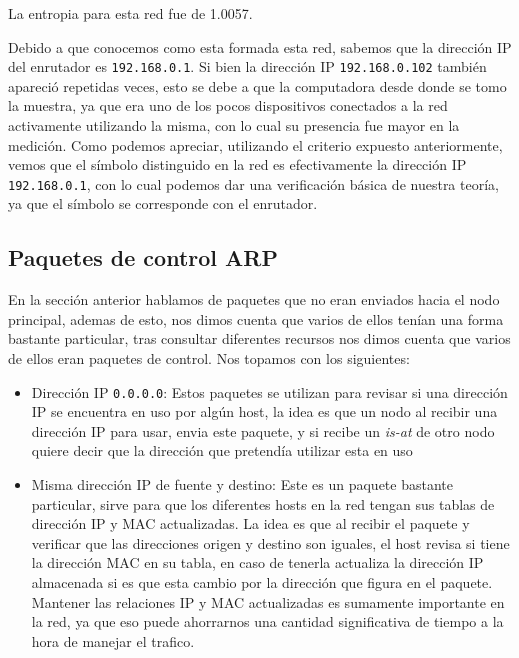 La entropia para esta red fue de 1.0057.


Debido a que conocemos como esta formada esta red, sabemos que la dirección IP del enrutador es \texttt{192.168.0.1}. Si bien la dirección IP \texttt{192.168.0.102} también apareció repetidas veces, esto se debe a que la computadora desde donde se tomo la muestra, ya que era uno de los pocos dispositivos conectados a la red activamente utilizando la misma, con lo cual su presencia fue mayor en la medición. Como podemos apreciar, utilizando el criterio expuesto anteriormente, vemos que el símbolo distinguido en la red es efectivamente la dirección IP \texttt{192.168.0.1}, con lo cual podemos dar una verificación básica de nuestra teoría, ya que el símbolo se corresponde con el enrutador.

\subsection{Paquetes de control ARP}

En la sección anterior hablamos de paquetes que no eran enviados hacia el nodo principal, ademas de esto, nos dimos cuenta que varios de ellos tenían una forma bastante particular, tras consultar diferentes recursos nos dimos cuenta que varios de ellos eran paquetes de control. Nos topamos con los siguientes:

\begin{itemize}
	\item Dirección IP \texttt{0.0.0.0}: Estos paquetes se utilizan para revisar si una dirección IP se encuentra en uso por algún host, la idea es que un nodo al recibir una dirección IP para usar, envia este paquete, y si recibe un \textit{is-at} de otro nodo quiere decir que la dirección que pretendía utilizar esta en uso
	\item Misma dirección IP de fuente y destino: Este es un paquete bastante particular, sirve para que los diferentes hosts en la red tengan sus tablas de dirección IP y MAC actualizadas. La idea es que al recibir el paquete y verificar que las direcciones origen y destino son iguales, el host revisa si tiene la dirección MAC en su tabla, en caso de tenerla actualiza la dirección IP almacenada si es que esta cambio por la dirección que figura en el paquete. Mantener las relaciones IP y MAC actualizadas es sumamente importante en la red, ya que eso puede ahorrarnos una cantidad significativa de tiempo a la hora de manejar el trafico.
\end{itemize}


